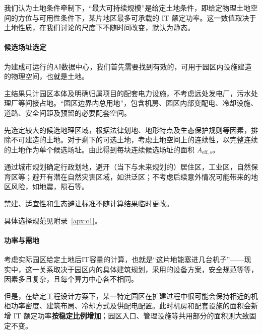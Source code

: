 \begin{asum}[静态建成状态]\label{asum:static}
我们认为土地条件牵制下，“最大可持续规模”是给定土地条件，即给定物理土地空间的方位与可用性条件下，某片地区最多可承载的 IT 额定功率。这一数值取决于土地性质，在我们讨论的尺度下不随时间改变，默认为静态。
\end{asum}

\paragraph{候选场址选定}\label{sec:land-site}

为建成可运行的AI数据中心，我们首先需要找到有效的，可用于园区内设施建造的物理空间，也就是土地。

\begin{asum}[固定研究边界]\label{asum:boundary}
主结果只计园区本体及明确归属项目的配套电力设施，不考虑远处发电厂，污水处理厂等间接占地。“园区边界内总用地”，包含机房、园区内部变配电、冷却设施、道路、安全间距及预留的必要配套空间。
\end{asum}

先选定较大的候选地理区域，根据法律划地、地形特点及生态保护规则等因素，排除不可建造的土地。对于剩下的可选土地，考虑土地空间上的连续性，以完整连续的土地作为单个候选场址。由此得到每块连续候选场址的面积 $A_{\mathrm{eff},s}$。

\begin{asum}[可持续]\label{asum:sustainable}
通过城市规划确定行政划地，避开（当下与未来规划的）居住区，工业区，自然保育区等；避开有潜在自然灾害区域，如洪泛区；不考虑后续意外情况可能带来的地区风险，如地震，陨石等。

禁建、适宜性和生态避让标准不随计算结果临时更改。
\end{asum}

具体选择规范见附录~\ref{apx:c1}。

\paragraph{功率与需地}\label{sec:land-power}

考虑实际园区给定土地后IT容量的计算，也就是“这片地能塞进几台机子”——现实中，这一关系取决于园区内的具体建筑规划，采用的设备方案，安全规范等等，因素多且复杂，且每个算力中心各不相同。

但是，在给定工程设计方案下，某一特定园区在扩建过程中很可能会保持相近的机柜功率密度、建筑布局、冷却方式及供配电配置。此时机房和配套设施的面积会新增 IT 额定功率\textbf{按稳定比例增加}；园区入口、管理设施等共用部分的面积则大致固定不变。

